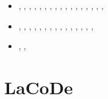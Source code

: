 \begin{small}
\begin{itemize}
\item[\twothousandtwentythree] \textcite{wulq23},  \textcite{zhli23}, \textcite{palb23},
                               \textcite{ankm23},  \textcite{pezg23}, \textcite{izhy23},
                               \textcite{bogj23},  \textcite{lige23}, \textcite{stgc23},
                               \textcite{chzl23},  \textcite{walh23}, \textcite{yams23},
                               \textcite{xumm23},  \textcite{guyg23}, \textcite{sayb23},
                               \textcite{fava23},  \textcite{xicy23}, \textcite{kekg23}
\item[\twothousandtwentyfour]  \textcite{xicc24},  \textcite{fuli24}, \textcite{chzy24},
                               \textcite{sihf24},  \textcite{qicz24}, \textcite{qilb24},
                               \textcite{orbg24},  \textcite{ficd24}, \textcite{magp24},
                               \textcite{xibg24},  \textcite{xicm24}, \textcite{yacz24},
                               \textcite{makb24},  \textcite{culi24}, \textcite{zhhz24},
                               \textcite{erpz24}
\item[\twothousandtwentyfive]  \textcite{masg25},  \textcite{pezg25}, \textcite{ligr25}
\end{itemize}
\end{small}





\section{LaCoDe} 

